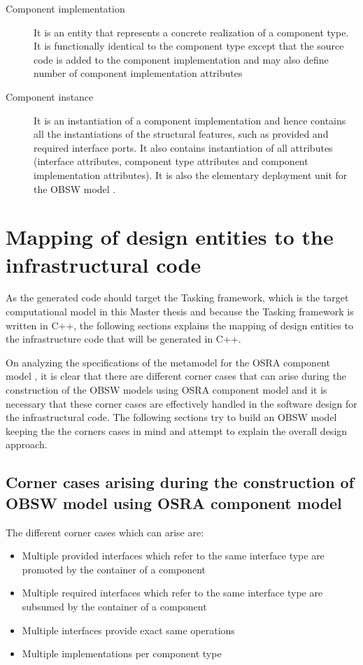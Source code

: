\begin{description}
\item [Component implementation] It is an entity that represents a concrete realization of a component type. It is functionally identical to the component type except that the source code is added to the component implementation and may also define number of component implementation attributes

\item [Component instance] It is an instantiation of a component implementation and hence contains all the instantiations of the structural features, such as provided and required interface ports. It also contains instantiation of all attributes (interface attributes, component type attributes and component implementation attributes). It is also the elementary deployment unit for the OBSW model \cite{SpecMetamodel}.        
\end{description}

\section{Mapping of design entities to the infrastructural code}
As the generated code should target the Tasking framework, which is the target computational model in this Master thesis and because the Tasking framework is written in C++, the following sections explains the mapping of design entities to the infrastructure code that will be generated in C++.

On analyzing the specifications of the metamodel for the OSRA component model \cite{SpecMetamodel}, it is clear that there are different corner cases that can arise during the construction of the OBSW models using OSRA component model and it is necessary that these corner cases are effectively handled in the software design for the infrastructural code. The following sections try to build an OBSW model keeping the the corners cases in mind and attempt to explain the overall design approach.

\subsection{Corner cases arising during the construction of OBSW model using OSRA component model}
The different corner cases which can arise are:

\begin{itemize}
\item Multiple provided interfaces which refer to the same interface type are promoted by the container of a component
\item Multiple required interfaces which refer to the same interface type are subsumed by the container of a component
\item Multiple interfaces provide exact same operations
\item Multiple implementations per component type
\end{itemize}

